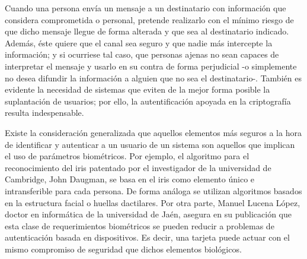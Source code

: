 \documentclass[../PFC.tex]{subfiles}
\begin{document}
Cuando una persona envía un mensaje a un destinatario con información que considera comprometida o personal, pretende realizarlo con el mínimo riesgo de que dicho mensaje llegue de forma alterada y que sea al destinatario indicado. Además, éste quiere que el canal sea seguro y que nadie más intercepte la información; y si ocurriese tal caso, que personas ajenas no sean capaces de interpretar el mensaje y usarlo en su contra de forma perjudicial -o simplemente no desea difundir la información a alguien que no sea el destinatario-. También es evidente la necesidad de sistemas que eviten de la mejor forma posible la suplantación de usuarios; por ello, la autentificación apoyada en la criptografía resulta indespensable.



Existe la consideración generalizada que aquellos elementos más seguros a la hora de identificar y autenticar a un usuario de un sistema son aquellos que implican el uso de parámetros biométricos. Por ejemplo, el algoritmo para el reconocimiento del iris patentado por el investigador de la universidad de Cambridge, John Daugman, se basa en el iris como elemento único e intransferible para cada persona\cite{ramli2008iris}. De forma análoga se utilizan algoritmos basados en la estructura facial o huellas dactilares. Por otra parte, Manuel Lucena López, doctor en informática de la universidad de Jaén, asegura en su publicación\cite{lucena} que esta clase de requerimientos biométricos se pueden reducir a problemas de autenticación basada en dispositivos. Es decir, una tarjeta puede actuar con el mismo compromiso de seguridad que dichos elementos biológicos.\\
\end{document}

